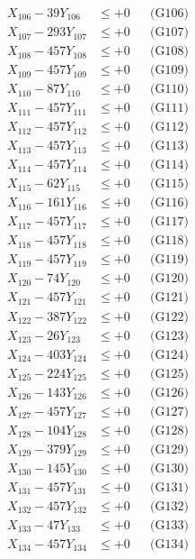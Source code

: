 \documentclass[a4paper,10pt]{article}
\begin{document}
{\begin{align}
X_{106} - 39Y_{106} &\leq +0 && \text{(G106)} \\
X_{107} - 293Y_{107} &\leq +0 && \text{(G107)} \\
X_{108} - 457Y_{108} &\leq +0 && \text{(G108)} \\
X_{109} - 457Y_{109} &\leq +0 && \text{(G109)} \\
X_{110} - 87Y_{110} &\leq +0 && \text{(G110)} \\
\allowbreak
X_{111} - 457Y_{111} &\leq +0 && \text{(G111)} \\
X_{112} - 457Y_{112} &\leq +0 && \text{(G112)} \\
X_{113} - 457Y_{113} &\leq +0 && \text{(G113)} \\
X_{114} - 457Y_{114} &\leq +0 && \text{(G114)} \\
X_{115} - 62Y_{115} &\leq +0 && \text{(G115)} \\
X_{116} - 161Y_{116} &\leq +0 && \text{(G116)} \\
X_{117} - 457Y_{117} &\leq +0 && \text{(G117)} \\
X_{118} - 457Y_{118} &\leq +0 && \text{(G118)} \\
X_{119} - 457Y_{119} &\leq +0 && \text{(G119)} \\
X_{120} - 74Y_{120} &\leq +0 && \text{(G120)} \\
\allowbreak
X_{121} - 457Y_{121} &\leq +0 && \text{(G121)} \\
X_{122} - 387Y_{122} &\leq +0 && \text{(G122)} \\
X_{123} - 26Y_{123} &\leq +0 && \text{(G123)} \\
X_{124} - 403Y_{124} &\leq +0 && \text{(G124)} \\
X_{125} - 224Y_{125} &\leq +0 && \text{(G125)} \\
X_{126} - 143Y_{126} &\leq +0 && \text{(G126)} \\
X_{127} - 457Y_{127} &\leq +0 && \text{(G127)} \\
X_{128} - 104Y_{128} &\leq +0 && \text{(G128)} \\
X_{129} - 379Y_{129} &\leq +0 && \text{(G129)} \\
X_{130} - 145Y_{130} &\leq +0 && \text{(G130)} \\
\allowbreak
X_{131} - 457Y_{131} &\leq +0 && \text{(G131)} \\
X_{132} - 457Y_{132} &\leq +0 && \text{(G132)} \\
X_{133} - 47Y_{133} &\leq +0 && \text{(G133)} \\
X_{134} - 457Y_{134} &\leq +0 && \text{(G134)} \\

\end{align}}
\end{document}
